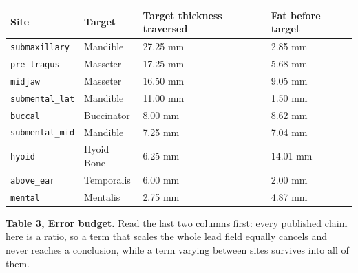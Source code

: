 \documentclass[manuscript,review,anonymous]{acmart}
\newcounter{none}
\begin{document}
{\def\LTcaptype{none} %
\begin{longtable}[]{@{}llll@{}}
\toprule\noalign{}
Site & Target & Target thickness traversed & Fat before target \\
\midrule\noalign{}
\endhead
\bottomrule\noalign{}
\endlastfoot
\texttt{submaxillary} & Mandible & 27.25 mm & 2.85 mm \\
\texttt{pre\_tragus} & Masseter & 17.25 mm & 5.68 mm \\
\texttt{midjaw} & Masseter & 16.50 mm & 9.05 mm \\
\texttt{submental\_lat} & Mandible & 11.00 mm & 1.50 mm \\
\texttt{buccal} & Buccinator & 8.00 mm & 8.62 mm \\
\texttt{submental\_mid} & Mandible & 7.25 mm & 7.04 mm \\
\texttt{hyoid} & Hyoid Bone & 6.25 mm & 14.01 mm \\
\texttt{above\_ear} & Temporalis & 6.00 mm & 2.00 mm \\
\texttt{mental} & Mentalis & 2.75 mm & 4.87 mm \\
\end{longtable}
}

\textbf{Table 3, Error budget.} Read the last two columns first: every published
claim here is a ratio, so a term that scales the whole lead field equally
cancels and never reaches a conclusion, while a term varying between sites
survives into all of them.
\end{document}
